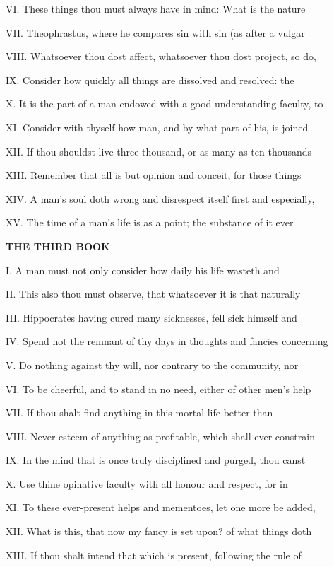 VI. These things thou must always have in
mind: What is the nature

VII. Theophrastus, where he compares sin with
sin (as after a vulgar

VIII. Whatsoever thou dost affect, whatsoever
thou dost project, so do,

IX. Consider how quickly all things are
dissolved and resolved: the

X. It is the part of a man endowed with a good
understanding faculty, to

XI. Consider with thyself how man, and by what
part of his, is joined

XII. If thou shouldst live three thousand, or
as many as ten thousands

XIII. Remember that all is but opinion and
conceit, for those things

XIV. A man's soul doth wrong and disrespect
itself first and especially,

XV. The time of a man's life is as a point;
the substance of it ever

\textbf{THE THIRD BOOK}

I. A man must not only consider how daily his
life wasteth and

II. This also thou must observe, that
whatsoever it is that naturally

III. Hippocrates having cured many sicknesses,
fell sick himself and

IV. Spend not the remnant of thy days in
thoughts and fancies concerning

V. Do nothing against thy will, nor contrary
to the community, nor

VI. To be cheerful, and to stand in no need,
either of other men's help

VII. If thou shalt find anything in this
mortal life better than

VIII. Never esteem of anything as profitable,
which shall ever constrain

IX. In the mind that is once truly disciplined
and purged, thou canst

X. Use thine opinative faculty with all honour
and respect, for in

XI. To these ever-present helps and mementoes,
let one more be added,

XII. What is this, that now my fancy is set
upon? of what things doth

XIII. If thou shalt intend that which is
present, following the rule of

